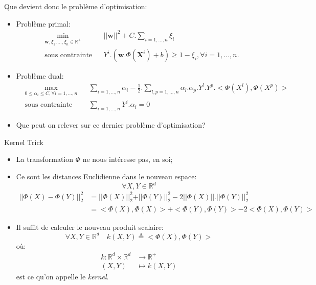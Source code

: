 \documentclass[8pt]{beamer}
\begin{document}
	\begin{frame}{Que devient donc le problème d'optimisation:}
		\begin{itemize}
			\item  Problème primal:
			\begin{equation}
				\begin{aligned}
				& \min_{\textbf{w}, \xi_1,\dots,\xi_n \in \mathbb{R}^+}
				& & {\vert\vert \textbf{w} \vert\vert}^2 + C.\sum_{i=1,\dots,n}\xi_i \\
				& \text{sous contrainte}
				& & Y^i.(\textbf{w}.\Phi(\textbf{X}^i) + b) \geq 1 - \xi_i , \forall i = 1, \dots, n.
				\end{aligned}
			\end{equation}
			\item  Problème dual:
			\begin{equation}
				\begin{aligned}
				& \max_{0 \leq \alpha_i \leq C ,\forall i=1,\dots,n}
				& & \sum_{i=1,\dots,n} \alpha_i - \frac{1}{2}.\sum_{l,p=1,\dots,n}\alpha_l.\alpha_p.Y^l.Y^p.<\Phi(X^l),\Phi(X^p)>\\
				& \text{sous contrainte}
				& & \sum_{i=1,\dots,n}Y^i.\alpha_i=0
				\end{aligned}
			\end{equation}
			\item  Que peut on relever sur ce dernier problème d'optimisation?
		\end{itemize}
	\end{frame}

	\begin{frame}{Kernel Trick}
		\begin{itemize}
			\item <1-> La transformation $\Phi$ ne nous intéresse pas, en soi;
			\item <2-> Ce sont les distances Euclidienne dans le nouveau espace:
			$$\forall X, Y \in \mathbb{R}^d$$
			\begin{align*}
				\vert\vert\Phi(X) - \Phi(Y)\vert\vert_2^2 &= \vert\vert\Phi(X)\vert\vert_2^2 + \vert\vert\Phi(Y)\vert\vert_2^2 - 2 \vert\vert\Phi(X)\vert\vert.\vert\vert\Phi(Y)\vert\vert_2^2 \\
				 &= <\Phi(X),\Phi(X)> + <\Phi(Y),\Phi(Y)> - 2 <\Phi(X),\Phi(Y)>
			\end{align*}
			\item <3-> Il suffit de calculer le nouveau produit scalaire:
			\begin{equation}
				\forall X, Y \in \mathbb{R}^d \quad k(X, Y) \triangleq <\Phi(X),\Phi(Y)>
			\end{equation}
			où:
			\begin{align*}
				k: \mathbb{R}^d \times \mathbb{R}^d &\rightarrow \mathbb{R}^+ \\
				(X, Y) &\mapsto k(X, Y)
			\end{align*}
			est ce qu'on appelle le \textit{kernel}.
		\end{itemize}
	\end{frame}
\end{document}
